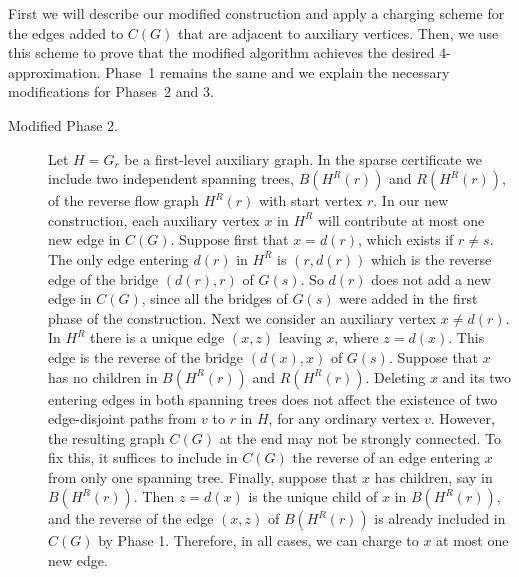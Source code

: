 \documentclass[11pt]{article}
\begin{document}
First we will describe our modified construction and apply a charging scheme for the edges added to $C(G)$ that are adjacent to auxiliary vertices.
Then, we use this scheme to prove that the modified algorithm achieves the desired $4$-approximation.
Phase~1 remains the same and we explain the necessary modifications for Phases~2 and 3.

\begin{description}
\item[Modified Phase 2.] Let $H=G_r$ be a first-level auxiliary graph.
In the sparse certificate we include two independent spanning trees, $B(H^R(r))$ and $R(H^R(r))$, of the reverse flow graph $H^R(r)$ with start vertex $r$.
In our new construction, each auxiliary vertex $x$ in $H^R$ will contribute at most one new edge in $C(G)$.
Suppose first that
$x=d(r)$, which exists if $r \not=s$. The only edge entering $d(r)$ in $H^R$ is $(r,d(r))$ which is the reverse edge of the bridge $(d(r),r)$ of $G(s)$. So $d(r)$ does not add a new edge in $C(G)$, since all the bridges of $G(s)$ were added in the first phase of the construction.
Next we consider an auxiliary vertex $x \not= d(r)$. In $H^R$ there is a unique edge $(x,z)$ leaving $x$, where $z=d(x)$.
This edge is the  reverse of the bridge $(d(x),x)$ of $G(s)$.
Suppose that $x$ has no children in $B(H^R(r))$ and $R(H^R(r))$.
Deleting $x$ and its two entering edges in both spanning trees does not affect the existence of two edge-disjoint paths from $v$ to $r$ in $H$, for any ordinary vertex $v$.
However, the resulting graph $C(G)$ at the end may not be strongly connected.
To fix this, it suffices to include in $C(G)$ the reverse of an edge entering $x$ from only one spanning tree.
Finally, suppose that $x$ has children, say in $B(H^R(r))$.
Then $z=d(x)$ is the unique child of $x$ in $B(H^R(r))$, and the reverse of the edge $(x,z)$ of $B(H^R(r))$ is already included in $C(G)$ by Phase 1.
Therefore, in all cases, we can charge to $x$ at most one new edge.


\end{description}
\end{document}

